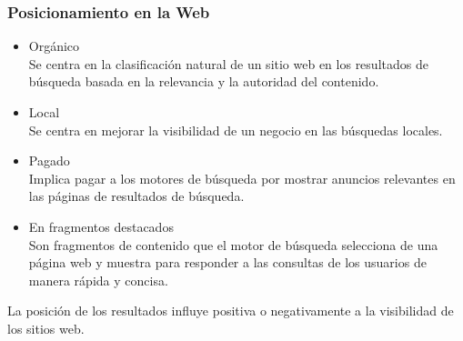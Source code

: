 \documentclass[
10pt, %
aspectratio=169, %
]{beamer}
\begin{document}
	\begin{frame}
		
		\frametitle{Posicionamiento en la Web}
		
		\begin{itemize}
			
			\item Orgánico \\
			Se centra en la clasificación natural de un sitio web en los resultados de búsqueda basada en la relevancia y la autoridad del contenido. \\[1.5mm]
			
			\item Local \\
			Se centra en mejorar la visibilidad de un negocio en las búsquedas locales. \\[1.5mm]
			
			\item Pagado \\
			Implica pagar a los motores de búsqueda por mostrar anuncios relevantes en las páginas de resultados de búsqueda. \\[1.5mm]
			
			\item En fragmentos destacados \\
			Son fragmentos de contenido que el motor de búsqueda selecciona de una página web y muestra para responder a las consultas de los usuarios de manera rápida y concisa. 
			
		\end{itemize}
		
		\vspace{2\baselineskip}
		
		La posición de los resultados influye positiva o negativamente a la visibilidad de los sitios web.
		
	\end{frame}
	
\end{document}
